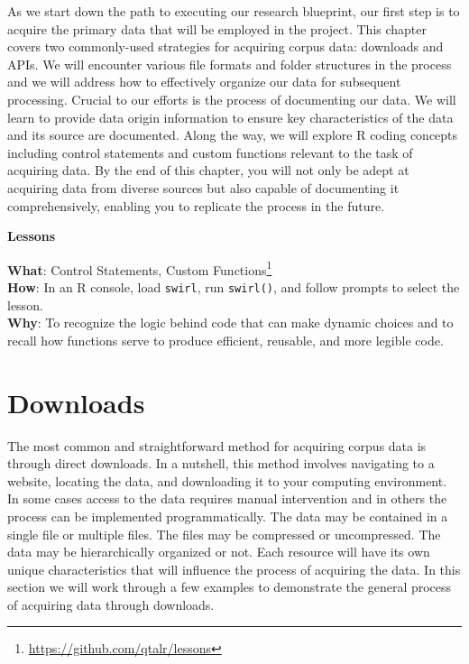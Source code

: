 \documentclass[
  letterpaper,
]{latex/krantz}
\theoremstyle{definition}
\theoremstyle{remark}
\DeclareRobustCommand{\href}[2]{#2\footnote{\url{#1}}}
\begin{document}
As we start down the path to executing our research blueprint, our first
step is to acquire the primary data that will be employed in the
project. This chapter covers two commonly-used strategies for acquiring
corpus data: downloads and APIs. We will encounter various file formats
and folder structures in the process and we will address how to
effectively organize our data for subsequent processing. Crucial to our
efforts is the process of documenting our data. We will learn to provide
data origin information to ensure key characteristics of the data and
its source are documented. Along the way, we will explore R coding
concepts including control statements and custom functions relevant to
the task of acquiring data. By the end of this chapter, you will not
only be adept at acquiring data from diverse sources but also capable of
documenting it comprehensively, enabling you to replicate the process in
the future.

\begin{tcolorbox}[enhanced jigsaw, colback=white, colframe=quarto-callout-color-frame, leftrule=.75mm, opacityback=0, rightrule=.15mm, bottomrule=.15mm, toprule=.15mm, breakable, left=2mm, arc=.35mm]

\textbf{ Lessons}

\textbf{What}: \href{https://github.com/qtalr/lessons}{Control
Statements, Custom Functions}\\
\textbf{How}: In an R console, load \texttt{swirl}, run
\texttt{swirl()}, and follow prompts to select the lesson.\\
\textbf{Why}: To recognize the logic behind code that can make dynamic
choices and to recall how functions serve to produce efficient,
reusable, and more legible code.

\end{tcolorbox}

\section{Downloads}\label{downloads}

The most common and straightforward method for acquiring corpus data is
through direct downloads. In a nutshell, this method involves navigating
to a website, locating the data, and downloading it to your computing
environment. In some cases access to the data requires manual
intervention and in others the process can be implemented
programmatically. The data may be contained in a single file or multiple
files. The files may be compressed or uncompressed. The data may be
hierarchically organized or not. Each resource will have its own unique
characteristics that will influence the process of acquiring the data.
In this section we will work through a few examples to demonstrate the
general process of acquiring data through downloads.
\end{document}
